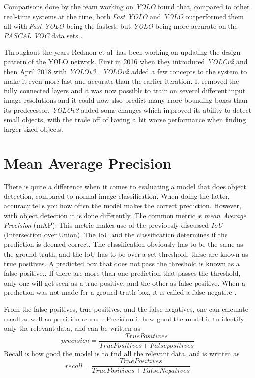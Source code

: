 Comparisons done by the team working on \textit{YOLO} found that, compared to other real-time systems at the time, both \textit{Fast YOLO} and \textit{YOLO} outperformed them all with \textit{Fast YOLO} being the fastest, but \textit{YOLO} being more accurate on the \textit{PASCAL VOC} data sets \cite{PASCAL}.

Throughout the years Redmon et al. has been working on updating the design pattern of the 
YOLO network. First in 2016 when they introduced \textit{YOLOv2} and then April 2018 with \textit{YOLOv3} \cite{YOLO2}\cite{YOLO3}. \textit{YOLOv2} added a few concepts to the system to make it even more fast and accurate than the earlier iteration. It removed the fully connected layers and it was now possible to train on several different input image resolutions and it could now also predict many more bounding boxes than its predecessor. \textit{YOLOv3} added some changes which improved its ability to detect small objects, with the trade off of having a bit worse performance when finding larger sized objects.  

\section{Mean Average Precision}
\label{sec:mAP}
There is quite a difference when it comes to evaluating a model that does object detection,  compared to normal image classification. When doing the latter, accuracy tells you how often the model makes the correct prediction. However, with object detection it is done differently. The common metric is \textit{mean Average Precision} (mAP).  This metric makes use of the previously discussed \textit{IoU} (Intersection over Union). The IoU and the classification determines if the prediction is deemed correct. The classification obviously has to be the same as the ground truth, and the IoU has to be over a set threshold, these are known as true positives. A predicted box that does not pass the threshold is known as a false positive.. If there are more than one prediction that passes the threshold, only one will get seen as a true positive, and the other as false positive. When a prediction was not made for a ground truth box, it is called a false negative \cite{turiAdvanced}.

From the false positives, true positives, and the false negatives, one can calculate recall as well as precision scores \cite{rafaelpadilla}.  Precision is how good the model is to identify only the relevant data, and can be written as
\[ precision = \frac{True Positives}{True Positives + False positives }\]
Recall is how good the model is to find all the relevant data, and is written as 
\[ recall = \frac{True Positives}{True Positives +False Negatives }\]

